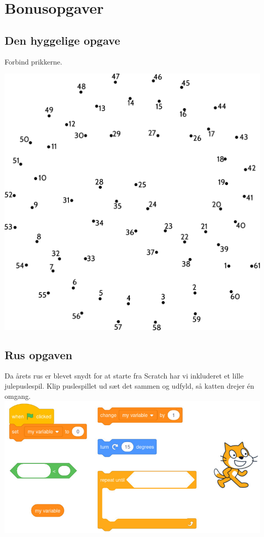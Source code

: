 \section{\huge{Bonusopgaver}}

\subsection{Den hyggelige opgave}

Forbind prikkerne.

\begin{center}
\includegraphics[width=.99\textwidth]{forbind-prikkerne.pdf}
\end{center}


\newpage
\subsection{Rus opgaven}
Da årets rus er blevet snydt for at starte fra Scratch har vi inkluderet et
lille julepuslespil. Klip puslespillet ud sæt det sammen og udfyld, så katten
drejer én omgang.
\hspace*{-0.15\textwidth}\includegraphics[width=1.3\textwidth]{figures/scratch.jpg}
\vspace{-.8cm}
